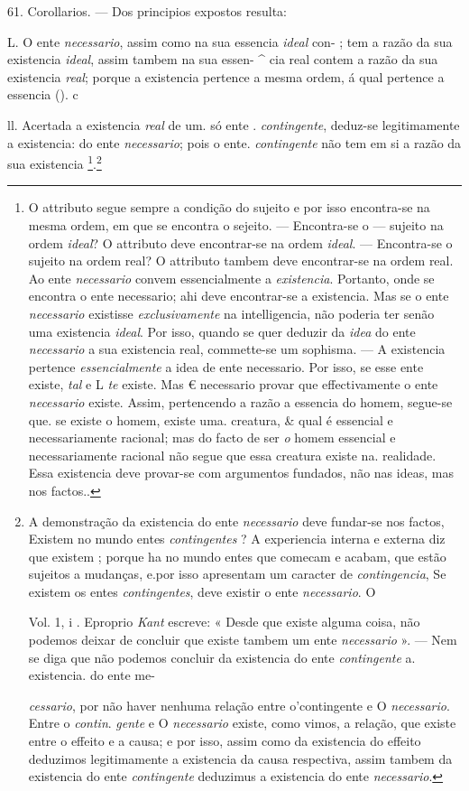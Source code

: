  61. Corollarios. --- Dos principios expostos resulta:

L. O ente \emph{necessario}, assim como na sua essencia \emph{ideal} con- ; tem a razão da sua existencia \emph{ideal}, assim tambem na sua essen- \textasciicircum{} cia real contem a razão da sua existencia \emph{real}; porque a existencia pertence a mesma ordem, á qual pertence a essencia (). c

ll. Acertada a existencia \emph{real} de um. só ente . \emph{contingente}, deduz-se legitimamente a existencia: do ente \emph{necessario}; pois o ente. \emph{contingente} não tem em si a razão da sua existencia \footnote{O attributo segue sempre a condição do sujeito e por isso encontra-se na mesma ordem, em que se encontra o sejeito. --- Encontra-se o --- sujeito na ordem \emph{ideal}? O attributo deve encontrar-se na ordem \emph{ideal}. --- Encontra-se o sujeito na ordem real? O attributo tambem deve encontrar-se na ordem real. Ao ente \emph{necessario} convem essencialmente a \emph{existencia}. Portanto, onde se encontra o ente necessario; ahi deve encontrar-se a existencia. Mas se o ente \emph{necessario} existisse \emph{exclusivamente} na intelligencia, não poderia ter senão uma existencia \emph{ideal}. Por isso, quando se quer deduzir da \emph{idea} do ente \emph{necessario} a sua existencia real, commette-se um sophisma. --- A existencia pertence \emph{essencialmente} a idea de ente necessario. Por isso, se esse ente existe, \emph{tal} e L \emph{te} existe. Mas € necessario provar que effectivamente o ente \emph{necessario} existe. Assim, pertencendo a razão a essencia do homem, segue-se que. se existe o homem, existe uma. creatura, \& qual é essencial e necessariamente racional; mas do facto de ser \emph{o} homem essencial e necessariamente racional não segue que essa creatura existe na. realidade. Essa existencia deve provar-se com argumentos fundados, não nas ideas, mas nos factos..}.\footnote{A demonstração da existencia do ente \emph{necessario} deve fundar-se nos factos, Existem no mundo entes \emph{contingentes} ? A experiencia interna e externa diz que existem ; porque ha no mundo entes que comecam e acabam, que estão sujeitos a mudanças, e.por isso apresentam um caracter de \emph{contingencia}, Se existem os entes \emph{contingentes}, deve existir o ente \emph{necessario}. O\par Vol. 1, i . Eproprio \emph{Kant} escreve: « Desde que existe alguma coisa, não podemos deixar de concluir que existe tambem um ente \emph{necessario} ». --- Nem se diga que não podemos concluir da existencia do ente \emph{contingente} a. existencia. do ente me-\par \emph{cessario}, por não haver nenhuma relação entre o'contingente e O \emph{necessario}. Entre o \emph{contin}. \emph{gente} e O \emph{necessario} existe, como vimos, a relação, que existe entre o effeito e a causa; e por isso, assim como da existencia do effeito deduzimos legitimamente a existencia da causa respectiva, assim tambem da existencia do ente \emph{contingente} deduzimus a existencia do ente \emph{necessario}.}

